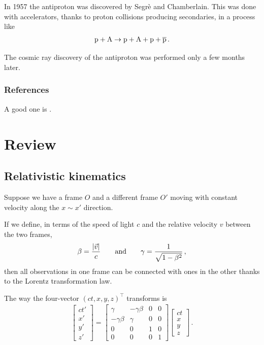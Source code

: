 \documentclass[main.tex]{subfiles}
\begin{document}
In 1957 the antiproton was discovered by Segrè and Chamberlain.
This was done with accelerators, thanks to proton collisions producing secondaries, in a process like 
%
\begin{align}
\ce{p} + \ce{A} \to \ce{p} + \ce{A} + \ce{p} + \ce{\overline{p}}
\,.
\end{align}
%
 
The cosmic ray discovery of the antiproton was performed only a few months later. 


\subsubsection*{References}

A good one is \textcite{aloisioSelectedTopicsCosmic2018}.

\section{Review}

\subsection{Relativistic kinematics}

Suppose we have a frame \(O\) and a different frame \(O'\) moving with constant velocity along the \(x \sim x'\) direction. 

If we define, in terms of the speed of light \(c\) and the relative velocity \(v\) between the two frames,
%
\begin{align}
\beta  = \frac{\abs{\vec{v}}}{c} \qquad \text{and} \qquad
\gamma = \frac{1}{\sqrt{1 - \beta^2}}
\,,
\end{align}
%
then all observations in one frame can be connected with ones in the other thanks to the Lorentz transformation law. 

The way the four-vector \((ct, x, y, z)^{\top}\) transforms is 
%
\begin{subequations}
\begin{align}
\left[\begin{array}{c}
ct' \\ 
x' \\ 
y' \\ 
z'
\end{array}\right]
= \left[\begin{array}{cccc}
\gamma  & -\gamma \beta  & 0 & 0 \\ 
-\gamma \beta  & \gamma  & 0 & 0 \\ 
0 & 0 & 1 & 0 \\ 
0 & 0 & 0 & 1
\end{array}\right]
\left[\begin{array}{c}
ct \\ 
x \\ 
y \\ 
z
\end{array}\right]
\,.
\end{align}
\end{subequations}
\end{document}

